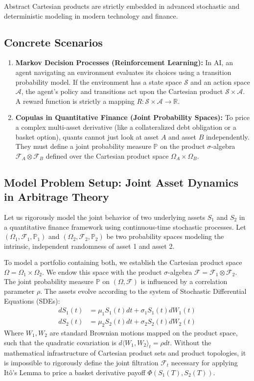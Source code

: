 \documentclass[12pt]{article}
\theoremstyle{definition}
\theoremstyle{remark}
\begin{document}
Abstract Cartesian products are strictly embedded in advanced stochastic and deterministic modeling in modern technology and finance.

\subsection{Concrete Scenarios}
\begin{enumerate}
    \item \textbf{Markov Decision Processes (Reinforcement Learning):} In AI, an agent navigating an environment evaluates its choices using a transition probability model. If the environment has a state space $\mathcal{S}$ and an action space $\mathcal{A}$, the agent's policy and transitions act upon the Cartesian product $\mathcal{S} \times \mathcal{A}$. A reward function is strictly a mapping $R: \mathcal{S} \times \mathcal{A} \to \mathbb{R}$.
    \item \textbf{Copulas in Quantitative Finance (Joint Probability Spaces):} To price a complex multi-asset derivative (like a collateralized debt obligation or a basket option), quants cannot just look at asset $A$ and asset $B$ independently. They must define a joint probability measure $\mathbb{P}$ on the product $\sigma$-algebra $\mathcal{F}_A \otimes \mathcal{F}_B$ defined over the Cartesian product space $\Omega_A \times \Omega_B$. 
\end{enumerate}

\subsection{Model Problem Setup: Joint Asset Dynamics in Arbitrage Theory}
Let us rigorously model the joint behavior of two underlying assets $S_1$ and $S_2$ in a quantitative finance framework using continuous-time stochastic processes. 
Let $(\Omega_1, \mathcal{F}_1, \mathbb{P}_1)$ and $(\Omega_2, \mathcal{F}_2, \mathbb{P}_2)$ be two probability spaces modeling the intrinsic, independent randomness of asset 1 and asset 2. 

To model a portfolio containing both, we establish the Cartesian product space $\Omega = \Omega_1 \times \Omega_2$. 
We endow this space with the product $\sigma$-algebra $\mathcal{F} = \mathcal{F}_1 \otimes \mathcal{F}_2$. 
The joint probability measure $\mathbb{P}$ on $(\Omega, \mathcal{F})$ is influenced by a correlation parameter $\rho$. The assets evolve according to the system of Stochastic Differential Equations (SDEs):
\begin{align*}
    dS_1(t) &= \mu_1 S_1(t)dt + \sigma_1 S_1(t)dW_1(t) \\
    dS_2(t) &= \mu_2 S_2(t)dt + \sigma_2 S_2(t)dW_2(t)
\end{align*}
Where $W_1, W_2$ are standard Brownian motions mapped on the product space, such that the quadratic covariation is $d\langle W_1, W_2 \rangle_t = \rho dt$. Without the mathematical infrastructure of Cartesian product sets and product topologies, it is impossible to rigorously define the joint filtration $\mathcal{F}_t$ necessary for applying Itô's Lemma to price a basket derivative payoff $\Phi(S_1(T), S_2(T))$.
\end{document}
